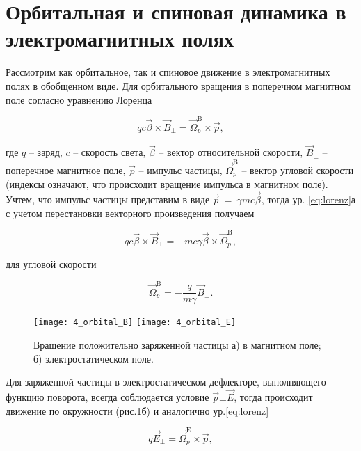 \section{Орбитальная и спиновая динамика в электромагнитных полях}\label{sec:EDM/requirements/deflector}

\par Рассмотрим как орбитальное, так и спиновое движение в электромагнитных полях в обобщенном виде. Для орбитального вращения в поперечном магнитном поле согласно уравнению Лоренца

\begin{equation} 
qc\vec{\beta}\times{\vec{B}}_\bot={\vec{\Omega}}_p^{\textrm{B}}\times\vec{p},
\label{eq:lorenz}
\end{equation}

\noindent где $q$ -- заряд, $c$ -- скорость света, $\vec{\beta}$ -- вектор относительной скорости, ${\vec{B}}_\bot$ -- поперечное магнитное поле, $\vec{p}$ -- импульс частицы, ${\vec{\Omega}}_p^{\textrm{B}}$ -- вектор угловой скорости (индексы означают, что происходит вращение импульса в магнитном поле). Учтем, что импульс частицы представим в виде $\vec{p}\ =\ \gamma mc\vec{\beta}$, тогда ур. \ref{eq:lorenz}а с учетом перестановки векторного произведения получаем

\begin{equation}	
qc\vec{\beta}\times{\vec{B}}_\bot=-mc\gamma\vec{\beta}\times{\vec{\Omega}}_p^{\textrm{B}},
\end{equation}

\noindent для угловой скорости

\begin{equation} \label{eq:omega_pB}
 {\vec{\Omega}}_p^{\textrm{B}}=-\frac{q}{m\gamma}{\vec{B}}_\bot.
\end{equation} 

\begin{figure}[!h]
  \centering
	\texttt{[image: 4\_orbital\_B]}
	\texttt{[image: 4\_orbital\_E]}
   \caption{Вращение положительно заряженной частицы а) в магнитном поле; б) электростатическом поле.}
   \label{fig:4_orbital_B_E}
\end{figure}

\par Для заряженной частицы в электростатическом дефлекторе, выполняющего функцию поворота, всегда соблюдается условие $\vec{p} \bot \vec{E}$, тогда происходит движение по окружности (рис.\ref{fig:4_orbital_B_E}б) и аналогично ур.\ref{eq:lorenz}

\begin{equation}
q{\vec{E}}_\bot={\vec{\Omega}}_p^{\textrm{E}}\times\vec{p},
\end{equation} 

